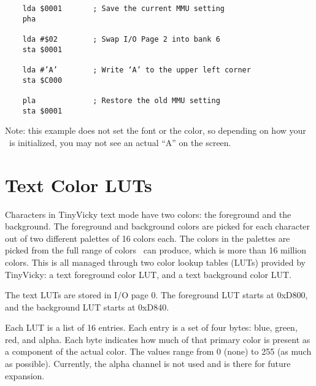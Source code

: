 \begin{verbatim}
    lda $0001       ; Save the current MMU setting
    pha

    lda #$02        ; Swap I/O Page 2 into bank 6
    sta $0001

    lda #’A’        ; Write ‘A’ to the upper left corner
    sta $C000

    pla             ; Restore the old MMU setting
    sta $0001
\end{verbatim}

Note: this example does not set the font or the color, so depending on how your \jr\ is initialized, you may not see an actual ``A'' on the screen.

\section{Text Color LUTs}

Characters in TinyVicky text mode have two colors: the foreground and the background. The foreground and background colors are picked for each character out of two different palettes of 16 colors each. The colors in the palettes are picked from the full range of colors \jr\ can produce, which is more than 16 million colors. This is all managed through two color lookup tables (LUTs) provided by TinyVicky: a text foreground color LUT, and a text background color LUT.

The text LUTs are stored in I/O page 0. The foreground LUT starts at 0xD800, and the background LUT starts at 0xD840.

Each LUT is a list of 16 entries. Each entry is a set of four bytes: blue, green, red, and alpha. Each byte indicates how much of that primary color is present as a component of the actual color. The values range from 0 (none) to 255 (as much as possible). Currently, the alpha channel is not used and is there for future expansion.

